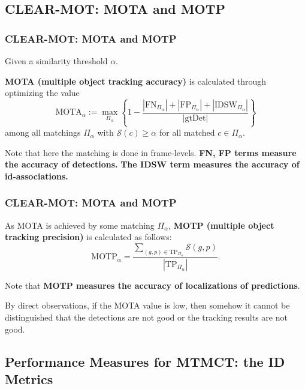 \documentclass[slidetop, mathserif]{beamer}
\begin{document}
\subsection{CLEAR-MOT: MOTA and MOTP}

\begin{frame}
	\frametitle{CLEAR-MOT: MOTA and MOTP}
	
	
	Given a similarity threshold $\alpha$.
	
	\quad
	
	{\bf MOTA (multiple object tracking accuracy)} is calculated through optimizing the value
	\[
		\text{MOTA}_\alpha :=
		\max_{\Pi_\alpha}
		\left\{1 - \dfrac{|\text{FN}_{\Pi_\alpha}| + |\text{FP}_{\Pi_\alpha}| + |\text{IDSW}_{\Pi_\alpha}|}{|\text{gtDet}|}\right\}
	\]
	among all matchings $\Pi_\alpha$ with $\mathcal S(c)\geq \alpha$ for all matched $c\in\Pi_\alpha$.
	
	\quad
	
	Note that here the matching is done in frame-levels.
	{\bf\color{blue} FN, FP terms measure the accuracy of detections.}
	{\bf\color{olive} The IDSW term measures the accuracy of id-associations.}
	
\end{frame}

\begin{frame}
	\frametitle{CLEAR-MOT: MOTA and MOTP}
	
	As MOTA is achieved by some matching $\Pi_\alpha$, {\bf MOTP (multiple object tracking precision)}
	is calculated as follows:
	\[
		\text{MOTP}_\alpha =
		\dfrac{\sum_{(g,p)\in\text{TP}_{\Pi_\alpha}}\mathcal S(g,p)}{|\text{TP}_{\Pi_\alpha}|}.
	\]
	
	\quad 
	
	Note that {\bf\color{red} MOTP measures the accuracy of localizations of predictions}.
	
	By direct observations, if the MOTA value is low,
	then somehow it cannot be distinguished that
	the detections are not good or the tracking results are not good.
	
	
\end{frame}

\subsection{Performance Measures for MTMCT: the ID Metrics}
\end{document}
